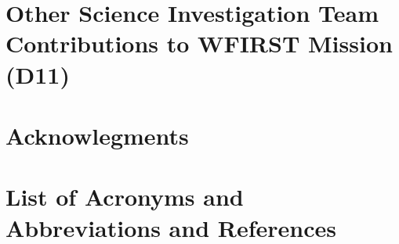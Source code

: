 \documentclass[letter]{ar-1col_WFIRST-HLS}
\newcommand{\Oli}[1]{\textcolor{red}{[{\bf Oli}: #1]}}
\begin{document}
%

\section{Other Science Investigation Team Contributions to WFIRST Mission (D11)}
\label{sec:other_contributions}


\vspace{-0.25cm}
\section*{Acknowlegments}
\label{sec:acknowledgments}


\newpage

\section*{List of Acronyms and Abbreviations and References}
\label{sec:acronyms}
\vspace{2 cm}


\clearpage
\newpage


%



\clearpage
\newpage
\end{document}

